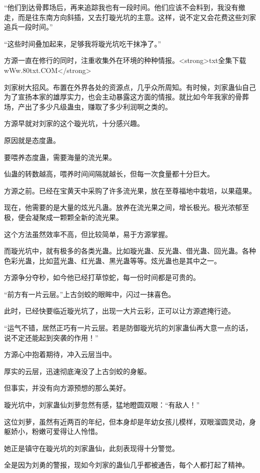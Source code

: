 \begin{this_body}
“他们到达骨葬场后，再来追踪我也有一段时间。他们应该不会料到，我没有撤走，而是往东南方向斜插，又去打璇光坑的主意。这样，说不定又会花费这些刘家追兵一段时间。”

“这些时间叠加起来，足够我将璇光坑吃干抹净了。”

方源一直在修行的同时，注重收集外在环境的种种情报。<strong>txt全集下载wWw.80txt.COM</strong>

刘家树大招风。布置在外界各处的资源点，几乎众所周知。有时候，刘家蛊仙自己为了宣扬本家的雄厚实力，也会主动暴露这方面的情报。就比如今年我家的骨葬场，产出了多少凡级蛊虫，赚取了多少利润啊之类的。

方源早就对刘家的这个璇光坑，十分感兴趣。

原因就是态度蛊。

要喂养态度蛊，需要海量的流光果。

仙蛊的转数越高，喂养时间间隔就越长，但每一次食量都十分巨大。

方源之前。已经在宝黄天中采购了许多流光果，放在至尊福地中栽培，以果蕴果。

现在，他需要的是大量的炫光凡蛊。放养在流光果之间，增长极光。极光浓郁至极，便会凝聚成一颗颗全新的流光果。

这个方法虽然效率不高，但比较简单，易于方源掌握。

而璇光坑中，就有极多的各类光蛊。比如璇光蛊、反光蛊、借光蛊、回光蛊。各种色彩光蛊，比如蓝光蛊、红光蛊、黑光蛊等等。炫光蛊也是其中之一。

方源争分夺秒，如今他已经打草惊蛇，每一份时间都是可贵的。

“前方有一片云层。”上古剑蛟的眼眸中，闪过一抹喜色。

此时，已经快要临近璇光坑了，出现一大片云彩，正可以让方源遮掩行迹。

“运气不错，居然正巧有一片云层。若是防御璇光坑的刘家蛊仙再大意一点的话，说不定还能起到突袭的作用！”

方源心中抱着期待，冲入云层当中。

厚实的云层，迅速彻底淹没了上古剑蛟的身躯。

但事实，并没有向方源预想的那么美好。

璇光坑中，刘家蛊仙刘萝忽然有感，猛地瞪圆双眼：“有敌人！”

这位刘萝，虽然有近两百的年纪，但本身却是年幼女孩儿模样，双眼溜圆灵动，身躯娇小，粉嫩可爱得让人怜惜。

她正是镇守在璇光坑的刘家蛊仙，此刻表现得十分警觉。

全是因为刘勇的警报，现如今刘家的蛊仙几乎都被通告，每个人都打起了精神。


\end{this_body}
